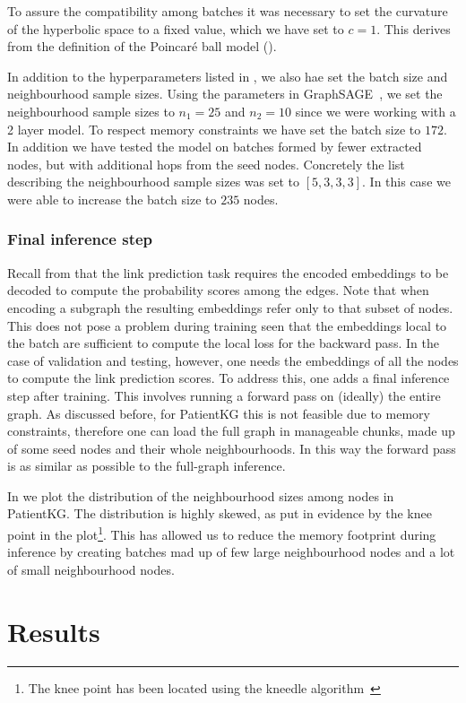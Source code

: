 To assure the compatibility among batches it was necessary to set the curvature of the hyperbolic space to a fixed value, which we have set to $c=1$. This derives from the definition of the Poincaré ball model ().

\medskip 

In addition to the hyperparameters listed in , we also hae set the batch size and neighbourhood sample sizes. Using the parameters in GraphSAGE~\cite{Hamilton2017inductiveRepresentationLearning}, we set the neighbourhood sample sizes to $n_1=25$ and $n_2=10$ since we were working with a 2 layer model. To respect memory constraints we have set the batch size to $172$. In addition we have tested the model on batches formed by fewer extracted nodes, but with additional hops from the seed nodes. Concretely the list describing the neighbourhood sample sizes was set to $[5,3,3,3]$. In this case we were able to increase the batch size to $235$ nodes.

\subsubsection{Final inference step}
Recall from  that the link prediction task requires the encoded embeddings to be decoded to compute the probability scores among the edges. Note that when encoding a subgraph the resulting embeddings refer only to that subset of nodes. This does not pose a problem during training seen that the embeddings local to the batch are sufficient to compute the local loss for the backward pass. In the case of validation and testing, however, one needs the embeddings of all the nodes to compute the link prediction scores. To address this, one adds a final inference step after training. This involves running a forward pass on (ideally) the entire graph. As discussed before, for PatientKG this is not feasible due to memory constraints, therefore one can load the full graph in manageable chunks, made up of some seed nodes and their whole neighbourhoods. In this way the forward pass is as similar as possible to the full-graph inference. 

In  we plot the distribution of the neighbourhood sizes among nodes in PatientKG. The distribution is highly skewed, as put in evidence by the knee point in the plot\footnote{The knee point has been located using the kneedle algorithm~\cite{satopaa2011KneePointDetection}}. This has allowed us to reduce the memory footprint during inference by creating batches mad up of few large neighbourhood nodes and a lot of small neighbourhood nodes. 





\section{Results}

% 